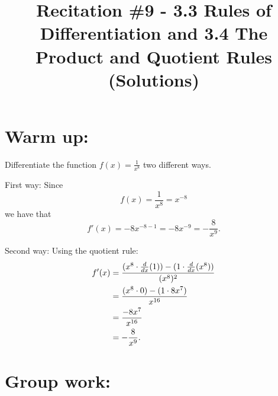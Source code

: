 \documentclass[nooutcomes]{ximera}
\title{Recitation \#9 - 3.3 Rules of Differentiation and 3.4 The Product and Quotient Rules (Solutions)}
\begin{document}
\begin{abstract}		\end{abstract}
\maketitle

\section*{Warm up:} 
Differentiate the function $f(x) = \frac{1}{x^8}$ two different ways.

	\begin{freeResponse}
	First way:  Since 
	$$f(x) = \frac{1}{x^8} = x^{-8}$$
	we have that
	$$f'(x) = -8x^{-8-1} = -8x^{-9} = -\frac{8}{x^9}.$$
	
	Second way:  Using the quotient rule: 
	\begin{align*}
	f'(x) &= \frac{(x^8 \cdot \frac{d}{dx}(1)) - (1 \cdot \frac{d}{dx}(x^8))}{(x^8)^2}  \\
	&= \frac{(x^8 \cdot 0) - (1 \cdot 8x^7)}{x^{16}}  \\
	&= \frac{-8x^7}{x^{16}}  \\
	&= - \frac{8}{x^9}.
	\end{align*}
	\end{freeResponse}	
	
	
	
	
	

\section*{Group work:}
\end{document}
